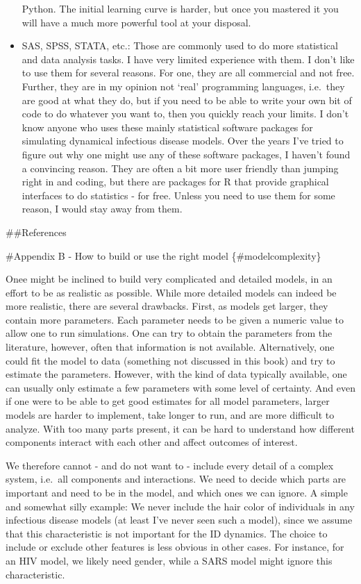 \documentclass[]{book}
\theoremstyle{definition}
\theoremstyle{definition}
\theoremstyle{definition}
\theoremstyle{remark}
\begin{document}
\begin{itemize}
  Python. The initial learning curve is harder, but once you mastered it
  you will have a much more powerful tool at your disposal.
\item
  SAS, SPSS, STATA, etc.: Those are commonly used to do more statistical
  and data analysis tasks. I have very limited experience with them. I
  don't like to use them for several reasons. For one, they are all
  commercial and not free. Further, they are in my opinion not `real'
  programming languages, i.e.~they are good at what they do, but if you
  need to be able to write your own bit of code to do whatever you want
  to, then you quickly reach your limits. I don't know anyone who uses
  these mainly statistical software packages for simulating dynamical
  infectious disease models. Over the years I've tried to figure out why
  one might use any of these software packages, I haven't found a
  convincing reason. They are often a bit more user friendly than
  jumping right in and coding, but there are packages for R that provide
  graphical interfaces to do statistics - for free. Unless you need to
  use them for some reason, I would stay away from them.
\end{itemize}

\#\#References

\#Appendix B - How to build or use the right model \{\#modelcomplexity\}

Onee might be inclined to build very complicated and detailed models, in
an effort to be as realistic as possible. While more detailed models can
indeed be more realistic, there are several drawbacks. First, as models
get larger, they contain more parameters. Each parameter needs to be
given a numeric value to allow one to run simulations. One can try to
obtain the parameters from the literature, however, often that
information is not available. Alternatively, one could fit the model to
data (something not discussed in this book) and try to estimate the
parameters. However, with the kind of data typically available, one can
usually only estimate a few parameters with some level of certainty. And
even if one were to be able to get good estimates for all model
parameters, larger models are harder to implement, take longer to run,
and are more difficult to analyze. With too many parts present, it can
be hard to understand how different components interact with each other
and affect outcomes of interest.

We therefore cannot - and do not want to - include every detail of a
complex system, i.e.~all components and interactions. We need to decide
which parts are important and need to be in the model, and which ones we
can ignore. A simple and somewhat silly example: We never include the
hair color of individuals in any infectious disease models (at least
I've never seen such a model), since we assume that this characteristic
is not important for the ID dynamics. The choice to include or exclude
other features is less obvious in other cases. For instance, for an HIV
model, we likely need gender, while a SARS model might ignore this
characteristic.
\end{document}
